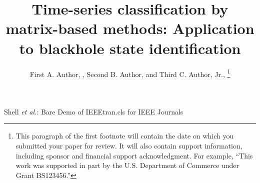 \documentclass[journal]{IEEEtran}
\begin{document}
	
	\title{ Time-series classification by matrix-based methods: Application to blackhole state identification}
	
	\author{First A. Author, , Second B. Author, and Third C. Author, Jr., 
		\thanks{This paragraph of the first footnote will contain the date on which you submitted your paper for review. It will also contain support information, including sponsor and financial support acknowledgment. For example, ``This work was supported in part by the U.S. Department of Commerce under Grant BS123456.'' }
	}
	
	{Shell \MakeLowercase{\textit{et al.}}: Bare Demo of IEEEtran.cls for IEEE Journals}
	\maketitle
	
\end{document}
